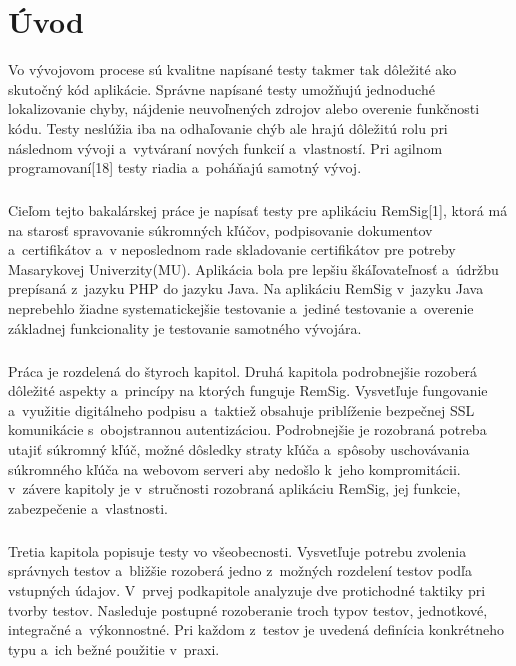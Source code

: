 \documentclass[
  digital, %
  table,   %
oneside,
  nolof,     %
  nolot,     %
]{fithesis3}
\begin{document}
\chapter{Úvod}
Vo vývojovom procese sú kvalitne napísané testy takmer tak dôležité ako skutočný kód aplikácie. Správne napísané testy umožňujú jednoduché lokalizovanie chyby, nájdenie neuvoľnených zdrojov alebo overenie funkčnosti kódu. Testy neslúžia iba na odhaľovanie chýb ale hrajú dôležitú rolu pri následnom vývoji a~vytváraní nových funkcií a~vlastností. Pri agilnom programovaní[18] testy riadia a~poháňajú samotný vývoj. \paragraph{}
Cieľom tejto bakalárskej práce je napísať testy pre aplikáciu RemSig[1], ktorá má na starosť spravovanie súkromných kľúčov, podpisovanie dokumentov a~certifikátov a~v neposlednom rade skladovanie certifikátov pre potreby Masarykovej Univerzity(MU). Aplikácia bola pre lepšiu škáľovateľnosť a~údržbu prepísaná z~jazyku PHP do jazyku Java. Na aplikáciu RemSig  v~jazyku Java neprebehlo žiadne systematickejšie testovanie a~jediné testovanie a~overenie základnej funkcionality je testovanie samotného vývojára.\paragraph{}
Práca je rozdelená do štyroch kapitol. Druhá kapitola podrobnejšie rozoberá dôležité aspekty a~princípy na ktorých funguje RemSig. Vysvetľuje fungovanie a~využitie digitálneho podpisu a~taktiež obsahuje priblíženie bezpečnej SSL komunikácie s~obojstrannou autentizáciou. Podrobnejšie je rozobraná potreba utajiť súkromný kľúč, možné dôsledky straty kľúča a~spôsoby uschovávania súkromného kľúča na webovom serveri aby nedošlo k~jeho kompromitácii. v~závere kapitoly  je v~stručnosti rozobraná aplikáciu RemSig, jej funkcie, zabezpečenie a~vlastnosti. \paragraph{}
Tretia kapitola popisuje testy vo všeobecnosti. Vysvetľuje potrebu zvolenia správnych testov a~bližšie rozoberá jedno z~možných rozdelení testov podľa vstupných údajov. V~prvej podkapitole analyzuje dve protichodné taktiky pri tvorby testov. Nasleduje postupné rozoberanie troch typov testov, jednotkové, integračné a~výkonnostné. Pri každom z~testov je uvedená definícia konkrétneho typu a~ich bežné použitie v~praxi.\paragraph{}
\end{document}
